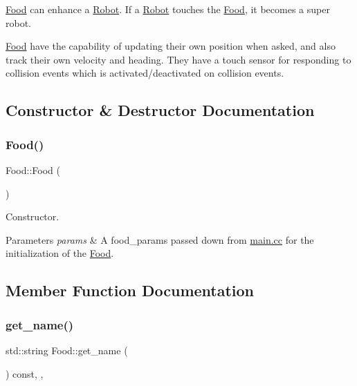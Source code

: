 \mbox{\hyperlink{class_food}{Food}} can enhance a \mbox{\hyperlink{class_robot}{Robot}}. If a \mbox{\hyperlink{class_robot}{Robot}} touches the \mbox{\hyperlink{class_food}{Food}}, it becomes a super robot.

\mbox{\hyperlink{class_food}{Food}} have the capability of updating their own position when asked, and also track their own velocity and heading. They have a touch sensor for responding to collision events which is activated/deactivated on collision events. 

\subsection{Constructor \& Destructor Documentation}
\mbox{\label{class_food_a75d4d7f76fd495cc8133302ca9fdc485}} 
\subsubsection{\texorpdfstring{Food()}{Food()}}
{\footnotesize\ttfamily Food\+::\+Food (\begin{DoxyParamCaption}{ }\end{DoxyParamCaption})}



Constructor. 


\begin{DoxyParams}{Parameters}
{\em params} & A food\+\_\+params passed down from \mbox{\hyperlink{main_8cc}{main.\+cc}} for the initialization of the \mbox{\hyperlink{class_food}{Food}}. \\
\hline
\end{DoxyParams}


\subsection{Member Function Documentation}
\mbox{\label{class_food_a5c3bcd5109750a15ebb24b8a2a3cdd07}} 
\subsubsection{\texorpdfstring{get\+\_\+name()}{get\_name()}}
{\footnotesize\ttfamily std\+::string Food\+::get\+\_\+name (\begin{DoxyParamCaption}{ }\end{DoxyParamCaption}) const\hspace{0.3cm}{\ttfamily [inline]}, {\ttfamily [override]}, {\ttfamily [virtual]}}



